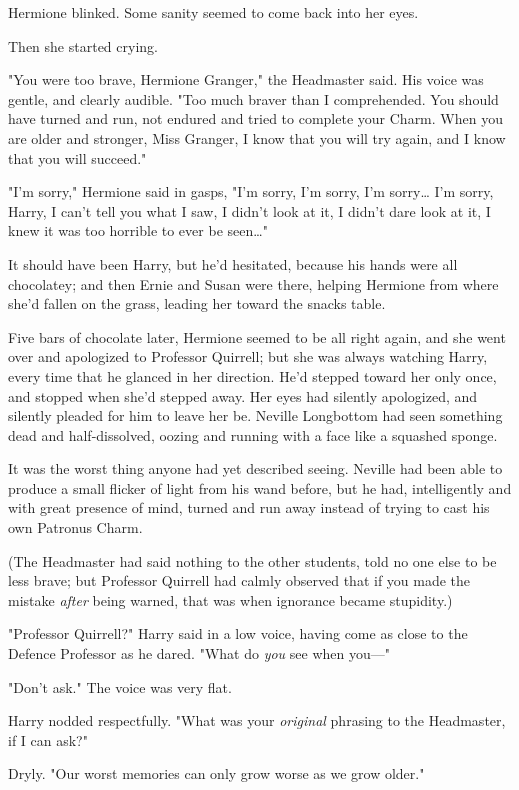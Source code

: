 Hermione blinked. Some sanity seemed to come back into her eyes.

Then she started crying.

"You were too brave, Hermione Granger," the Headmaster said. His voice was
gentle, and clearly audible. "Too much braver than I comprehended. You should
have turned and run, not endured and tried to complete your Charm. When you are
older and stronger, Miss Granger, I know that you will try again, and I know
that you will succeed."

"I'm sorry," Hermione said in gasps, "I'm sorry, I'm sorry, I'm sorry{\ldots}
I'm sorry, Harry, I can't tell you what I saw, I didn't look at it, I didn't
dare look at it, I knew it was too horrible to ever be seen{\ldots}"

It should have been Harry, but he'd hesitated, because his hands were all
chocolatey; and then Ernie and Susan were there, helping Hermione from where
she'd fallen on the grass, leading her toward the snacks table.

Five bars of chocolate later, Hermione seemed to be all right again, and she
went over and apologized to Professor Quirrell; but she was always watching
Harry, every time that he glanced in her direction. He'd stepped toward her
only once, and stopped when she'd stepped away. Her eyes had silently
apologized, and silently pleaded for him to leave her be.
\later
Neville Longbottom had seen something dead and half-dissolved, oozing and
running with a face like a squashed sponge.

It was the worst thing anyone had yet described seeing. Neville had been able
to produce a small flicker of light from his wand before, but he had,
intelligently and with great presence of mind, turned and run away instead of
trying to cast his own Patronus Charm.

(The Headmaster had said nothing to the other students, told no one else to be
less brave; but Professor Quirrell had calmly observed that if you made the
mistake \emph{after} being warned, that was when ignorance became stupidity.)

"Professor Quirrell?" Harry said in a low voice, having come as close to the
Defence Professor as he dared. "What do \emph{you} see when you---"

"Don't ask." The voice was very flat.

Harry nodded respectfully. "What was your \emph{original} phrasing to the
Headmaster, if I can ask?"

Dryly. "Our worst memories can only grow worse as we grow older."

